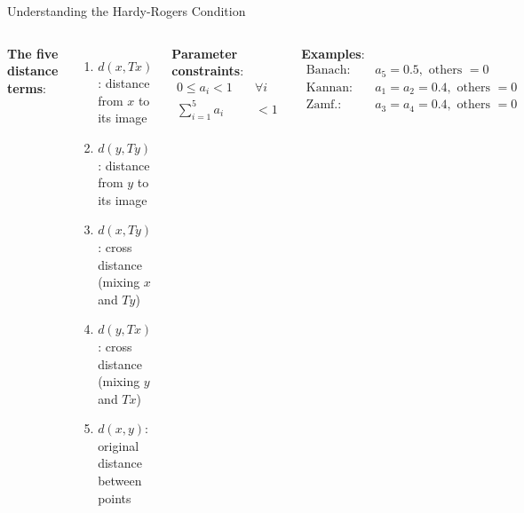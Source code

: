 \documentclass[aspectratio=169,10pt]{beamer}
\begin{document}
\begin{frame}{Understanding the Hardy-Rogers Condition}
    \begin{columns}[T]
        \textbf{The five distance terms}:

        \begin{enumerate}
            \setlength\itemsep{0.3cm}
            \item $d(x, Tx)$: distance from $x$ to its image
            \item $d(y, Ty)$: distance from $y$ to its image
            \item $d(x, Ty)$: cross distance (mixing $x$ and $Ty$)
            \item $d(y, Tx)$: cross distance (mixing $y$ and $Tx$)
            \item $d(x, y)$: original distance between points
        \end{enumerate}

        \textbf{Parameter constraints}:
        \begin{align*}
            0 \leq a_i < 1 \quad &\forall i \\
            \sum_{i=1}^{5} a_i &< 1
        \end{align*}

        \textbf{Examples}:
        \begin{align*}
            \text{Banach:} \quad &a_5 = 0.5, \text{ others } = 0 \\
            \text{Kannan:} \quad &a_1 = a_2 = 0.4, \text{ others } = 0 \\
            \text{Zamf.:} \quad &a_3 = a_4 = 0.4, \text{ others } = 0
        \end{align*}
    \end{columns}
\end{frame}
\end{document}
